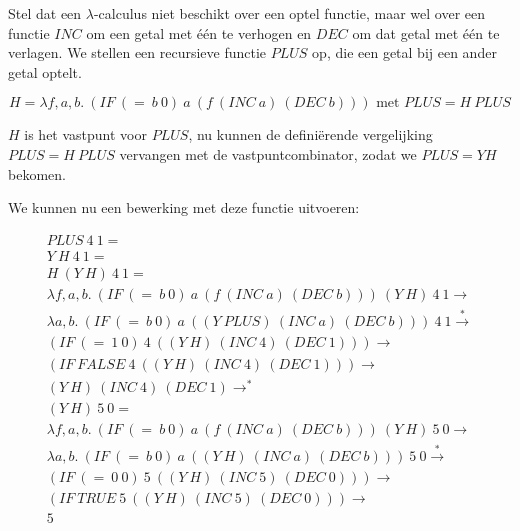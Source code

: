 Stel dat een $\lambda$-calculus niet beschikt over een optel functie, maar wel over een functie $INC$ om een getal met \'e\'en te verhogen en $DEC$ om dat getal met \'e\'en te verlagen. We stellen een recursieve functie $PLUS$ op, die een getal bij een ander getal optelt.

\begin{equation*}
  H = \lambda f,a,b.\ (IF\ (=\ b\ 0)\ a\ (f\ (INC\ a)\ (DEC\ b))) \text{ met } PLUS = H\ PLUS
\end{equation*}

$H$ is het vastpunt voor $PLUS$, nu kunnen de defini\"erende vergelijking $PLUS = H\ PLUS$ vervangen met de vastpuntcombinator, zodat we $PLUS = Y H$ bekomen.

We kunnen nu een bewerking met deze functie uitvoeren:

\begin{equation*}
\begin{aligned}
PLUS\ 4\ 1 = \\
Y\ H\ 4\ 1 = \\
H\ (Y\ H)\ 4\ 1 = \\
\lambda f,a,b.\ (IF\ (=\ b\ 0)\ a\ (f\ (INC\ a)\ (DEC\ b)))\ (Y\ H)\ 4\ 1 \rightarrow \\
\lambda a,b.\ (IF\ (=\ b\ 0)\ a\ ((Y\ PLUS)\ (INC\ a)\ (DEC\ b)))\ 4\ 1 \stackrel{*}{\longrightarrow} \\
(IF\ (=\ 1\ 0)\ 4\ ((Y\ H)\ (INC\ 4)\ (DEC\ 1))) \rightarrow \\
(IF\ FALSE\ 4\ ((Y\ H)\ (INC\ 4)\ (DEC\ 1))) \rightarrow \\
(Y\ H)\ (INC\ 4)\ (DEC\ 1) \rightarrow^* \\
(Y\ H)\ 5\ 0 = \\
\lambda f,a,b.\ (IF\ (=\ b\ 0)\ a\ (f\ (INC\ a)\ (DEC\ b)))\ (Y\ H)\ 5\ 0 \rightarrow \\
\lambda a,b.\ (IF\ (=\ b\ 0)\ a\ ((Y\ H)\ (INC\ a)\ (DEC\ b)))\ 5\ 0 \stackrel{*}{\longrightarrow} \\
(IF\ (=\ 0\ 0)\ 5\ ((Y\ H)\ (INC\ 5)\ (DEC\ 0))) \rightarrow \\
(IF\ TRUE\ 5\ ((Y\ H)\ (INC\ 5)\ (DEC\ 0))) \rightarrow \\
5
\end{aligned}
\end{equation*}